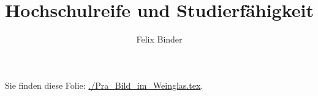 \documentclass{beamer}%
\title{Hochschulreife und Studierfähigkeit}
\author[Felix Binder]{Felix Binder}
\newcommand{\Einbinden}[1]{\par Sie finden diese Folie: \url{#1}.\par}
\begin{document}
\Einbinden{./Pra_Bild_im_Weinglas.tex}
\end{document}
